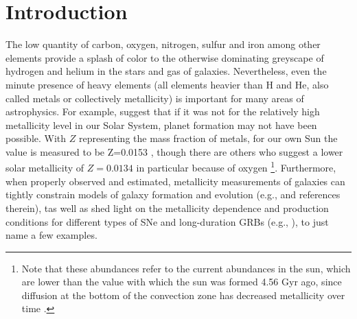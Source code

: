 \documentclass{emulateapj}
\begin{document}
\section{Introduction}
The low quantity of carbon, oxygen, nitrogen, sulfur and iron among other elements provide a splash of color to the otherwise dominating greyscape of hydrogen and helium in the stars and gas of galaxies. Nevertheless, even the minute presence of heavy elements (all elements heavier than H and He, also called metals or collectively metallicity) is important for many areas of astrophysics. For example, \citet{johnson12} suggest that if it was not for the relatively high metallicity level in our Solar System, planet formation may not have been possible. With $Z$ representing the mass fraction of metals, for our own Sun the value is measured to be  Z=0.0153 \citep{chaffau11}, though there are others who suggest a lower solar metallicity of $Z=0.0134$ in particular because of oxygen \citep{asplund09_rev,grevesse10}\footnote{Note that these abundances refer to the current abundances in the sun, which are lower than the value with which the sun was formed 4.56 Gyr ago, since diffusion at the bottom of the convection zone has decreased metallicity over time \citep{grevesse10}.}. Furthermore, when properly observed and estimated, metallicity measurements of galaxies can tightly constrain models of galaxy formation and evolution (e.g., \citealt{kewley08} and references therein), tas well as shed light on the metallicity dependence and production conditions for different types of SNe and long-duration GRBs (e.g., \citealt{modjaz08_Z,levesque10_grbhosts,anderson10,modjaz11,kelly12,sanders12,lunnan14,leloudas14}), to just name a few examples.
\end{document}
